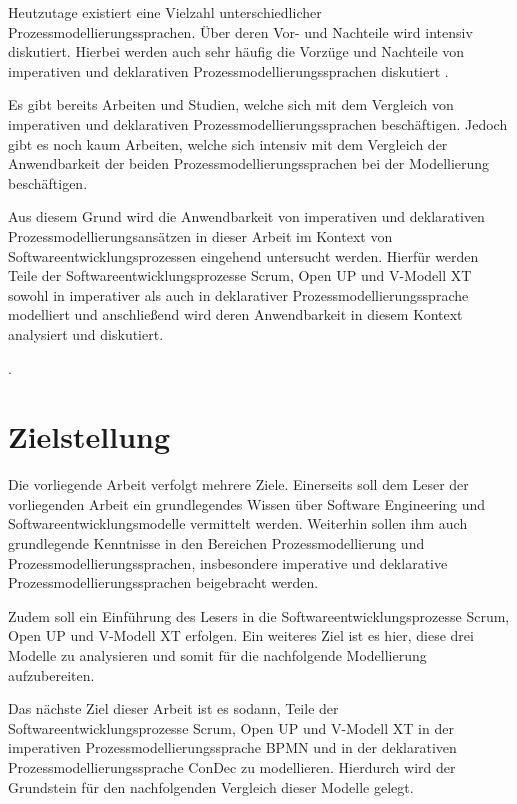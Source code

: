 Heutzutage existiert eine Vielzahl unterschiedlicher Prozessmodellierungssprachen. Über deren Vor- und Nachteile wird intensiv diskutiert. Hierbei werden auch sehr häufig die Vorzüge und Nachteile von imperativen und deklarativen Prozessmodellierungssprachen diskutiert \cite{fahland2010}. \newline

Es gibt bereits Arbeiten und Studien, welche sich mit dem Vergleich von imperativen und deklarativen Prozessmodellierungssprachen beschäftigen. Jedoch gibt es noch kaum Arbeiten, welche sich intensiv mit dem Vergleich der Anwendbarkeit der beiden Prozessmodellierungssprachen bei der Modellierung beschäftigen.\newline

Aus diesem Grund wird die Anwendbarkeit von imperativen und deklarativen Prozessmodellierungsansätzen in dieser Arbeit im Kontext von Softwareentwicklungsprozessen eingehend untersucht werden. Hierfür werden Teile der Softwareentwicklungsprozesse Scrum, Open UP und V-Modell XT sowohl in imperativer als auch in deklarativer Prozessmodellierungssprache modelliert und anschließend wird deren Anwendbarkeit in diesem Kontext analysiert und diskutiert.\newline

.


\section{Zielstellung}
Die vorliegende Arbeit verfolgt mehrere Ziele. Einerseits soll dem Leser der vorliegenden Arbeit ein grundlegendes Wissen über Software Engineering und Softwareentwicklungsmodelle vermittelt werden. Weiterhin sollen ihm auch grundlegende Kenntnisse in den Bereichen Prozessmodellierung und Prozessmodellierungssprachen, insbesondere imperative und deklarative Prozessmodellierungssprachen beigebracht werden. \newline

Zudem soll ein Einführung des Lesers in die Softwareentwicklungsprozesse Scrum, Open UP und V-Modell XT erfolgen. Ein weiteres Ziel ist es hier, diese drei Modelle zu analysieren und somit für die nachfolgende Modellierung aufzubereiten.\newline

Das nächste Ziel dieser Arbeit ist es sodann, Teile der Softwareentwicklungsprozesse Scrum, Open UP und V-Modell XT in der imperativen Prozessmodellierungssprache BPMN und in der deklarativen Prozessmodellierungssprache ConDec zu modellieren. Hierdurch wird der Grundstein für den nachfolgenden Vergleich dieser Modelle gelegt.\newline

